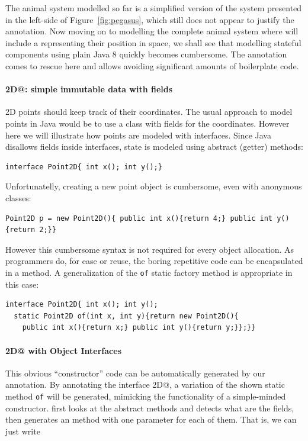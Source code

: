 The animal system modelled so far is a simplified version of the
system presented in the left-side of Figure~\ref{fig:pegasus}, which still does not appear to
justify the \mixinAnn{} annotation.  Now moving on to modelling
the complete animal system where \Q@Animal@s will include a \Q@location@
representing their position in space, we shall
see that modelling stateful components using plain Java 8 quickly becomes
cumbersome. The \mixinAnn{} annotation comes to rescue here and
allows avoiding significant amounts of boilerplate code.

\paragraph{\Q@Point2D@: simple immutable data with fields}
2D points should keep track of their coordinates.  The usual
approach to model points in Java would be to use a class with fields for the
coordinates. However here we will illustrate how points are modeled with
interfaces. Since Java disallows fields inside interfaces, state is modeled
using abstract (getter) methods:

\begin{lstlisting}
interface Point2D{ int x(); int y();}
\end{lstlisting}

\noindent Unfortunatelly, creating a new point object is cumbersome, even
with anonymous classes:

\begin{lstlisting}
Point2D p = new Point2D(){ public int x(){return 4;} public int y(){return 2;}}
\end{lstlisting}

\noindent However this cumbersome syntax is not required for every
object allocation. As programmers do, for ease or reuse, the boring
repetitive code can be encapsulated in a method. A generalization of the
\texttt{of} static factory method is appropriate in this case:
\begin{lstlisting}
interface Point2D{ int x(); int y();
  static Point2D of(int x, int y){return new Point2D(){
    public int x(){return x;} public int y(){return y;}};}}
\end{lstlisting}

\vspace{-5pt}
\paragraph{\Q@Point2D@ with Object Interfaces}
This obvious ``constructor'' code can be automatically generated by our \mixin
annotation.  By annotating the interface \Q@Point2D@, a variation of the shown
static method \texttt{of} will be generated, mimicking the functionality of a
simple-minded constructor. \mixin first looks at the abstract methods and detects
what are the fields, then generates an \Q@of@ method with one parameter for each
of them. That is, we can just write

